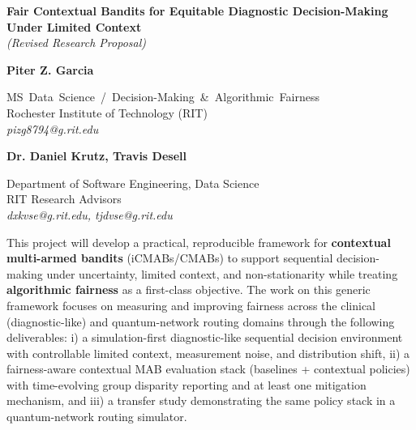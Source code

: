\documentclass[12pt]{article}
\begin{document}
\pagestyle{empty}

\noindent
\begin{center}
{\large\bf Fair Contextual Bandits for Equitable Diagnostic Decision-Making\\ Under Limited Context}\\[0.2em]
{\large\textit{(Revised Research Proposal)}}
\end{center}

\begin{center}
\begin{minipage}{0.48\linewidth}
\begin{center}
{\bf Piter Z. Garcia}\\
\begin{small}
{\footnotesize\mbox{MS Data Science / Decision-Making \& Algorithmic~Fairness}}\\
Rochester Institute of Technology (RIT)\\
{\it pizg8794@g.rit.edu}
\end{small}
\end{center}
\end{minipage}
\begin{minipage}{0.48\linewidth}
\begin{center}
{\bf Dr. Daniel Krutz, Travis Desell}\\
\begin{small}
Department of Software Engineering, Data Science\\
RIT Research Advisors\\
{\it dxkvse@g.rit.edu, tjdvse@g.rit.edu}
\end{small}
\end{center}
\end{minipage}
\end{center}

\noindent
This project will develop a practical, reproducible framework for {\bf contextual multi-armed bandits} (iCMABs/\allowbreak{}CMABs)
to support sequential decision-making under uncertainty, limited context, and non-stationarity while treating {\bf algorithmic fairness} as a first-class objective.
The work on this generic framework focuses on measuring and improving fairness across the clinical (diagnostic-like) and quantum-network routing domains through the following deliverables:
i) a simulation-first diagnostic-like sequential decision environment with controllable limited context, measurement noise, and distribution shift,
ii) a fairness-aware contextual MAB evaluation stack (baselines + contextual policies) with time-evolving group disparity reporting and at least one mitigation mechanism,
and iii) a transfer study demonstrating the same policy stack in a quantum-network routing simulator.
\end{document}
